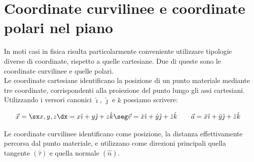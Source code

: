 \section{Coordinate curvilinee e coordinate polari nel piano}
In moti casi in fisica risulta particolarmente conveniente utilizzare tipologie diverse di coordinate, rispetto a quelle cartesiane. Due di queste sono le coordinate curvilinee e quelle polari.\\
Le coordinate cartesiane identificano la posizione di un punto materiale mediante tre coordinate, corrispondenti alla proiezione del punto lungo gli assi cartesiani. Utilizzando i versori canonici $\hat\imath$, $\hat\jmath$ e $\hat k$ possiamo scrivere:




\begin{equation}
\vec x = \sx x, y, z\dx = x\hat\imath + y\hat\jmath + z\hat k\seg \vec v = \dot x\hat\imath +\dot y\hat\jmath +\dot z\hat k\quad\quad\vec a = \ddot x\hat\imath +\ddot y\hat\jmath +\ddot z\hat k
\end{equation}

Le coordinate curvilinee identificano come posizione, la distanza effettivamente percorsa dal punto materiale, e utilizzano come direzioni principali quella tangente $(\hat\tau)$ e quella normale $(\hat n)$.\\

